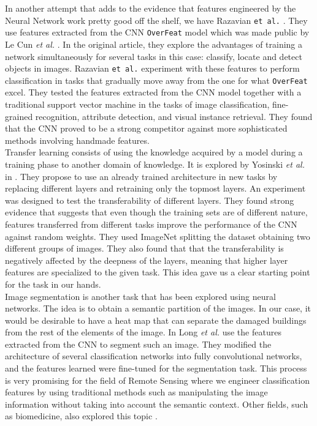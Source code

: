 In another attempt that adds to the evidence that features engineered by the Neural Network work pretty good off the shelf, we have Razavian \texttt{et al.} \cite{DBLP:journals/corr/RazavianASC14}. They use features extracted from the CNN \texttt{OverFeat} model which was made public by Le Cun \textit{et al.} \cite{DBLP:journals/corr/SermanetEZMFL13}. In the original article, they explore the advantages of training a network simultaneously for several tasks in this case: classify, locate and detect objects in images. Razavian \texttt{et al.} experiment with these features to perform classification in tasks that gradually move away from the one for what \texttt{OverFeat} excel. They tested the features extracted from the CNN model together with a traditional support vector machine in the tasks of image classification, fine-grained recognition, attribute detection, and visual instance retrieval. They found that the CNN proved to be a strong competitor against more sophisticated methods involving handmade features.\\

Transfer learning consists of using the knowledge acquired by a model during a training phase to another domain of knowledge. It is explored by Yosinski \textit{et al.} in \cite{DBLP:journals/corr/YosinskiCBL14}. They propose to use an already trained architecture in new tasks by replacing different layers and retraining only the topmost layers. An experiment was designed to test the transferability of different layers. They found strong evidence that suggests that even though the training sets are of different nature, features transferred from different tasks improve the performance of the CNN against random weights. They used ImageNet \cite{Deng09imagenet:a} splitting the dataset obtaining two different groups of images. They also found that that the transferability is negatively affected by the deepness of the layers, meaning that higher layer features are specialized to the given task. This idea gave us a clear starting point for the task in our hands.\\

Image segmentation is another task that has been explored using neural networks. The idea is to obtain a semantic partition of the images. In our case, it would be desirable to have a heat map that can separate the damaged buildings from the rest of the elements of the image. In \cite{DBLP:journals/corr/LongSD14} Long \textit{et al.} use the features extracted from the CNN to segment such an image. They modified the architecture of several classification networks into fully convolutional networks, and the features learned were fine-tuned for the segmentation task. This process is very promising for the field of Remote Sensing where we engineer classification features by using traditional methods such as manipulating the image information without taking into account the semantic context. Other fields, such as biomedicine, also explored this topic \cite{DBLP:journals/corr/RonnebergerFB15}.\\

